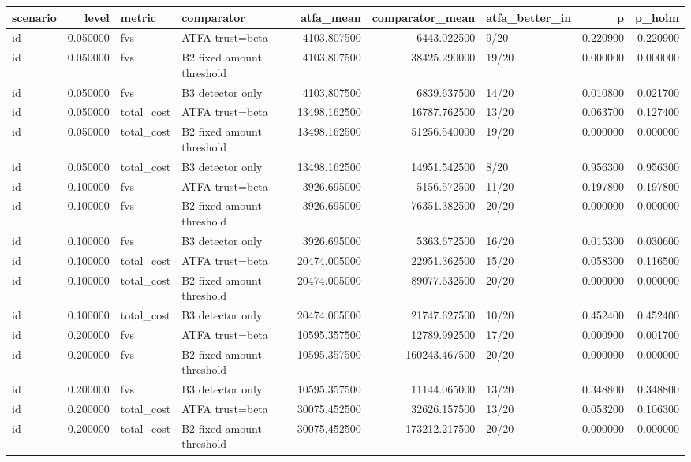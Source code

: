 \begin{tabular}{lrllrrlrr}
\toprule
scenario & level & metric & comparator & atfa\_mean & comparator\_mean & atfa\_better\_in & p & p\_holm \\
\midrule
id & 0.050000 & fvs & ATFA trust=beta & 4103.807500 & 6443.022500 & 9/20 & 0.220900 & 0.220900 \\
id & 0.050000 & fvs & B2 fixed amount threshold & 4103.807500 & 38425.290000 & 19/20 & 0.000000 & 0.000000 \\
id & 0.050000 & fvs & B3 detector only & 4103.807500 & 6839.637500 & 14/20 & 0.010800 & 0.021700 \\
id & 0.050000 & total\_cost & ATFA trust=beta & 13498.162500 & 16787.762500 & 13/20 & 0.063700 & 0.127400 \\
id & 0.050000 & total\_cost & B2 fixed amount threshold & 13498.162500 & 51256.540000 & 19/20 & 0.000000 & 0.000000 \\
id & 0.050000 & total\_cost & B3 detector only & 13498.162500 & 14951.542500 & 8/20 & 0.956300 & 0.956300 \\
id & 0.100000 & fvs & ATFA trust=beta & 3926.695000 & 5156.572500 & 11/20 & 0.197800 & 0.197800 \\
id & 0.100000 & fvs & B2 fixed amount threshold & 3926.695000 & 76351.382500 & 20/20 & 0.000000 & 0.000000 \\
id & 0.100000 & fvs & B3 detector only & 3926.695000 & 5363.672500 & 16/20 & 0.015300 & 0.030600 \\
id & 0.100000 & total\_cost & ATFA trust=beta & 20474.005000 & 22951.362500 & 15/20 & 0.058300 & 0.116500 \\
id & 0.100000 & total\_cost & B2 fixed amount threshold & 20474.005000 & 89077.632500 & 20/20 & 0.000000 & 0.000000 \\
id & 0.100000 & total\_cost & B3 detector only & 20474.005000 & 21747.627500 & 10/20 & 0.452400 & 0.452400 \\
id & 0.200000 & fvs & ATFA trust=beta & 10595.357500 & 12789.992500 & 17/20 & 0.000900 & 0.001700 \\
id & 0.200000 & fvs & B2 fixed amount threshold & 10595.357500 & 160243.467500 & 20/20 & 0.000000 & 0.000000 \\
id & 0.200000 & fvs & B3 detector only & 10595.357500 & 11144.065000 & 13/20 & 0.348800 & 0.348800 \\
id & 0.200000 & total\_cost & ATFA trust=beta & 30075.452500 & 32626.157500 & 13/20 & 0.053200 & 0.106300 \\
id & 0.200000 & total\_cost & B2 fixed amount threshold & 30075.452500 & 173212.217500 & 20/20 & 0.000000 & 0.000000 \\

\end{tabular}
